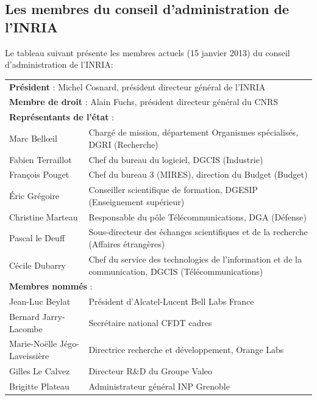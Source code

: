   \subsection{Les membres du conseil d'administration de l'INRIA}
  Le tableau suivant présente les membres actuels (15 janvier 2013) du conseil
  d'administration de l'INRIA: \par
      \begin{tabular}{|l|p{8cm}|}
    \multicolumn{2}{l}{\textbf{Président} : Michel Cosnard, président directeur général de
    l'INRIA} \\
    \multicolumn{2}{l}{\textbf{Membre de droit} : Alain Fuchs, président directeur général
    du CNRS} \\
        \multicolumn{2}{l}{\textbf{Représentants de l'état} :} \\
        \hline
        Marc Bellœil &
        Chargé de mission, département Organismes spécialisés, DGRI (Recherche) \\
        \hline
        Fabien Terraillot & Chef du bureau du logiciel, DGCIS (Industrie) \\
        François Pouget & Chef du bureau 3 (MIRES), direction du Budget (Budget) \\
        \hline
        Éric Grégoire &
        Conseiller scientifique de formation, DGESIP (Enseignement supérieur) \\
        \hline
        Christine Marteau & Responsable du pôle Télécommunications, DGA (Défense) \\
        \hline
        Pascal le Deuff &
        Sous-directeur des échanges scientifiques et de la recherche (Affaires étrangères) \\
        \hline
        Cécile Dubarry &
        Chef du service des technologies de l’information et de la communication, DGCIS (Télécommunications) \\
        \hline
        \multicolumn{2}{l}{\textbf{Membres nommés} :}\\
        \hline
        Jean-Luc Beylat & Président d’Alcatel-Lucent Bell Labs France \\
        \hline
        Bernard Jarry-Lacombe & Secrétaire national CFDT cadres \\
        \hline
        Marie-Noëlle Jégo-Laveissière & Directrice recherche et développement,
        Orange Labs \\
        \hline
        Gilles Le Calvez & Directeur R\&D du Groupe Valeo \\
        \hline
        Brigitte Plateau & Administrateur général INP Grenoble \\

\end{tabular}
